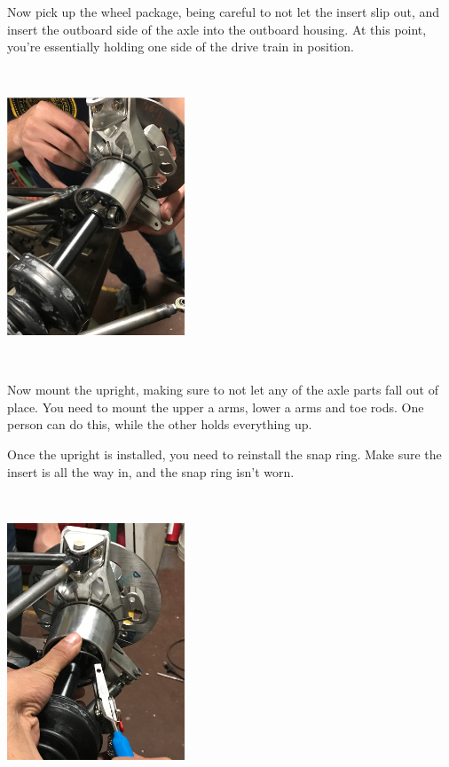 \documentclass{article}
\begin{document}
Now pick up the wheel package, being careful to not let the insert slip out, and insert the outboard side of the axle into the outboard housing. At this point, you're essentially holding one side of the drive train in position.

\begin{minipage}{\linewidth}
$\,$

\begin{center}
\includegraphics[width = 150pt]{AxleHoldOn.png}

\end{center}
$\,$
\end{minipage}

Now mount the upright, making sure to not let any of the axle parts fall out of place. You need to mount the upper a arms, lower a arms and toe rods. One person can do this, while the other holds everything up.

Once the upright is installed, you need to reinstall the snap ring. Make sure the insert is all the way in, and the snap ring isn't worn.

\begin{minipage}{\linewidth}
$\,$

\begin{center}
\includegraphics[width = 150pt]{SnapRingInstall.png}

\end{center}
$\,$
\end{minipage}
\end{document}
